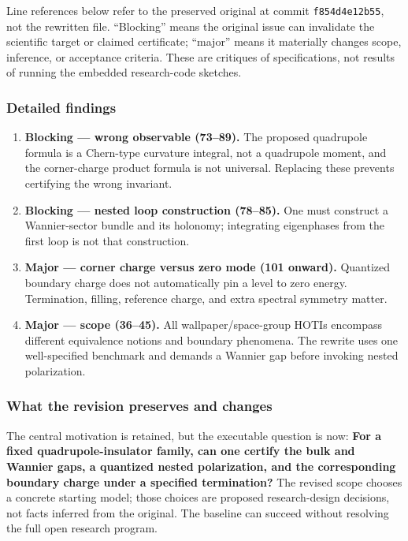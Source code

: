 \documentclass[
  11pt,
]{article}
\begin{document}
Line references below refer to the preserved original at commit
\texttt{f854d4e12b55}, not the rewritten file. ``Blocking'' means the
original issue can invalidate the scientific target or claimed
certificate; ``major'' means it materially changes scope, inference, or
acceptance criteria. These are critiques of specifications, not results
of running the embedded research-code sketches.

\subsubsection{Detailed findings}

\begin{enumerate}
\def\labelenumi{\arabic{enumi}.}
\item
  \textbf{Blocking --- wrong observable (73--89).} The proposed
  quadrupole formula is a Chern-type curvature integral, not a
  quadrupole moment, and the corner-charge product formula is not
  universal. Replacing these prevents certifying the wrong invariant.
\item
  \textbf{Blocking --- nested loop construction (78--85).} One must
  construct a Wannier-sector bundle and its holonomy; integrating
  eigenphases from the first loop is not that construction.
\item
  \textbf{Major --- corner charge versus zero mode (101 onward).}
  Quantized boundary charge does not automatically pin a level to zero
  energy. Termination, filling, reference charge, and extra spectral
  symmetry matter.
\item
  \textbf{Major --- scope (36--45).} All wallpaper/space-group HOTIs
  encompass different equivalence notions and boundary phenomena. The
  rewrite uses one well-specified benchmark and demands a Wannier gap
  before invoking nested polarization.
\end{enumerate}

\subsubsection{What the revision preserves and changes}

The central motivation is retained, but the executable question is now:
\textbf{For a fixed quadrupole-insulator family, can one certify the
bulk and Wannier gaps, a quantized nested polarization, and the
corresponding boundary charge under a specified termination?} The
revised scope chooses a concrete starting model; those choices are
proposed research-design decisions, not facts inferred from the
original. The baseline can succeed without resolving the full open
research program.
\end{document}

